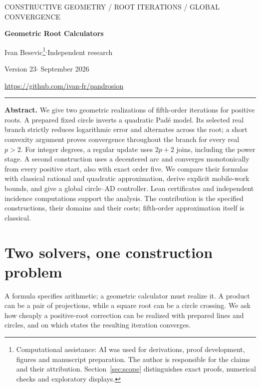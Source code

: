 \documentclass[11pt,a4paper]{article}
\begin{document}
\thispagestyle{empty}
{\small\sffamily\color{accent} CONSTRUCTIVE GEOMETRY / ROOT ITERATIONS / GLOBAL CONVERGENCE}\par
\vspace{8pt}
{\fontsize{24}{27}\selectfont\bfseries\color{ink} Geometric Root Calculators\par}
\vspace{5pt}{\large Two fifth-order solvers and their construction cost}\par
\vspace{9pt}Ivan Besevic\footnote{Computational assistance: AI was used for derivations, proof development, figures and manuscript preparation. The author is responsible for the claims and their attribution. Section~\ref{sec:scope} distinguishes exact proofs, numerical checks and exploratory displays.}\quad$\cdot$\quad Independent research\par
{\small Version 23\quad$\cdot$ September 2026}\par
\url{https://github.com/ivan-fr/pandrosion}
\vspace{8pt}\hrule\vspace{8pt}
\textbf{Abstract.}
We give two geometric realizations of fifth-order iterations for positive roots. A prepared fixed circle inverts a quadratic Pad\'e model. Its selected real branch strictly reduces logarithmic error and alternates across the root; a short convexity argument proves convergence throughout the branch for every real $p>2$. For integer degrees, a regular update uses $2p+2$ joins, including the power stage. A second construction uses a decentered arc and converges monotonically from every positive start, also with exact order five. We compare their formulas with classical rational and quadratic approximation, derive explicit mobile-work bounds, and give a global circle--AD controller. Lean certificates and independent incidence computations support the analysis. The contribution is the specified constructions, their domains and their costs; fifth-order approximation itself is classical.

\section{Two solvers, one construction problem}
A formula specifies arithmetic; a geometric calculator must realize it. A product can be a pair of projections, while a square root can be a circle crossing. We ask how cheaply a positive-root correction can be realized with prepared lines and circles, and on which states the resulting iteration converges.
\end{document}
